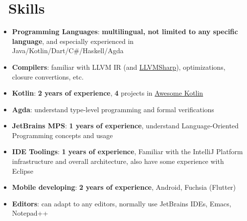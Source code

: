 \documentclass{resume}
\begin{document}
\section{\faCogs\ Skills}
\begin{itemize}[parsep=0.5ex]
  \item \textbf{Programming Languages}:
    \textbf{multilingual, not limited to any specific language},
    and especially experienced in Java/Kotlin/Dart/C\#/Haskell/Agda

  \item \textbf{Compilers}:
    familiar with LLVM IR (and \href{https://github.com/Microsoft/LLVMSharp/} {LLVMSharp}), optimizations, closure convertions, etc.

  \item \textbf{Kotlin}:
    \textbf{2 years of experience},
    \textbf{4} projects in
    \href{https://kotlin.link/?q=ice} {Awesome Kotlin}

  \item \textbf{Agda}:
    understand type-level programming and formal verifications

  \item \textbf{JetBrains MPS}:
    \textbf{1 years of experience},
    understand Language-Oriented Programming concepts and usage

  \item \textbf{IDE Toolings}:
    \textbf{1 years of experience},
    Familiar with the IntelliJ Platform infrastructure and overall architecture,
    also have some experience with Eclipse

  \item \textbf{Mobile developing}:
    \textbf{2 years of experience},
    Android, Fuchsia (Flutter)

  \item \textbf{Editors}:
    can adapt to any editors, normally use JetBrains IDEs, Emacs, Notepad++
\end{itemize}

\end{document}
